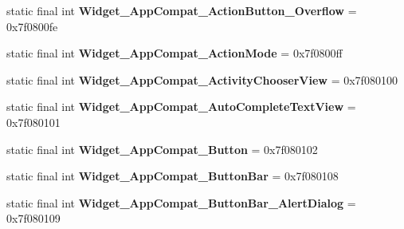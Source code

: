 \begin{DoxyCompactItemize}
\item 
\hypertarget{classandroid_1_1support_1_1v7_1_1appcompat_1_1_r_1_1style_a0b2c92644f2e6ec3ad85613e11f9c80c}{}static final int {\bfseries Widget\+\_\+\+App\+Compat\+\_\+\+Action\+Button\+\_\+\+Overflow} = 0x7f0800fe\label{classandroid_1_1support_1_1v7_1_1appcompat_1_1_r_1_1style_a0b2c92644f2e6ec3ad85613e11f9c80c}

\item 
\hypertarget{classandroid_1_1support_1_1v7_1_1appcompat_1_1_r_1_1style_ab558061ee2c1f9685ea9b614eaa9808a}{}static final int {\bfseries Widget\+\_\+\+App\+Compat\+\_\+\+Action\+Mode} = 0x7f0800ff\label{classandroid_1_1support_1_1v7_1_1appcompat_1_1_r_1_1style_ab558061ee2c1f9685ea9b614eaa9808a}

\item 
\hypertarget{classandroid_1_1support_1_1v7_1_1appcompat_1_1_r_1_1style_a798d9542c79456837c27af4af31d41a4}{}static final int {\bfseries Widget\+\_\+\+App\+Compat\+\_\+\+Activity\+Chooser\+View} = 0x7f080100\label{classandroid_1_1support_1_1v7_1_1appcompat_1_1_r_1_1style_a798d9542c79456837c27af4af31d41a4}

\item 
\hypertarget{classandroid_1_1support_1_1v7_1_1appcompat_1_1_r_1_1style_ae0db3ec24d96627ddd823d9513596e91}{}static final int {\bfseries Widget\+\_\+\+App\+Compat\+\_\+\+Auto\+Complete\+Text\+View} = 0x7f080101\label{classandroid_1_1support_1_1v7_1_1appcompat_1_1_r_1_1style_ae0db3ec24d96627ddd823d9513596e91}

\item 
\hypertarget{classandroid_1_1support_1_1v7_1_1appcompat_1_1_r_1_1style_a972eb28b6630bea576e5da76a6c71e87}{}static final int {\bfseries Widget\+\_\+\+App\+Compat\+\_\+\+Button} = 0x7f080102\label{classandroid_1_1support_1_1v7_1_1appcompat_1_1_r_1_1style_a972eb28b6630bea576e5da76a6c71e87}

\item 
\hypertarget{classandroid_1_1support_1_1v7_1_1appcompat_1_1_r_1_1style_a35ffe2c992c94dbfdd7b31694e76fa29}{}static final int {\bfseries Widget\+\_\+\+App\+Compat\+\_\+\+Button\+Bar} = 0x7f080108\label{classandroid_1_1support_1_1v7_1_1appcompat_1_1_r_1_1style_a35ffe2c992c94dbfdd7b31694e76fa29}

\item 
\hypertarget{classandroid_1_1support_1_1v7_1_1appcompat_1_1_r_1_1style_ae01cc979ac39252c299ba937499caab5}{}static final int {\bfseries Widget\+\_\+\+App\+Compat\+\_\+\+Button\+Bar\+\_\+\+Alert\+Dialog} = 0x7f080109\label{classandroid_1_1support_1_1v7_1_1appcompat_1_1_r_1_1style_ae01cc979ac39252c299ba937499caab5}


\end{DoxyCompactItemize}
